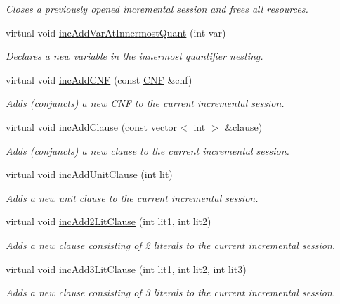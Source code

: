 \begin{DoxyCompactItemize}
\begin{DoxyCompactList}\small\item\em Closes a previously opened incremental session and frees all resources. \end{DoxyCompactList}\item 
virtual void \hyperlink{classDepQBFApi_ade58f545f2718850946391be977a6f9c}{inc\-Add\-Var\-At\-Innermost\-Quant} (int var)
\begin{DoxyCompactList}\small\item\em Declares a new variable in the innermost quantifier nesting. \end{DoxyCompactList}\item 
virtual void \hyperlink{classDepQBFApi_a1b3d100b4d70dd1200c8feb2d39accc6}{inc\-Add\-C\-N\-F} (const \hyperlink{classCNF}{C\-N\-F} \&cnf)
\begin{DoxyCompactList}\small\item\em Adds (conjuncts) a new \hyperlink{classCNF}{C\-N\-F} to the current incremental session. \end{DoxyCompactList}\item 
virtual void \hyperlink{classDepQBFApi_a76e51267fbf2c2a127ad874187bcf29a}{inc\-Add\-Clause} (const vector$<$ int $>$ \&clause)
\begin{DoxyCompactList}\small\item\em Adds (conjuncts) a new clause to the current incremental session. \end{DoxyCompactList}\item 
virtual void \hyperlink{classDepQBFApi_aa5755c46502a6016c48d6764ff087781}{inc\-Add\-Unit\-Clause} (int lit)
\begin{DoxyCompactList}\small\item\em Adds a new unit clause to the current incremental session. \end{DoxyCompactList}\item 
virtual void \hyperlink{classDepQBFApi_ab8e5a5e0adb6644ae6100afb07800dc3}{inc\-Add2\-Lit\-Clause} (int lit1, int lit2)
\begin{DoxyCompactList}\small\item\em Adds a new clause consisting of 2 literals to the current incremental session. \end{DoxyCompactList}\item 
virtual void \hyperlink{classDepQBFApi_a7300b61f89a10da1e6a679a3fd6ba9bc}{inc\-Add3\-Lit\-Clause} (int lit1, int lit2, int lit3)
\begin{DoxyCompactList}\small\item\em Adds a new clause consisting of 3 literals to the current incremental session. \end{DoxyCompactList}\item 

\end{DoxyCompactItemize}
